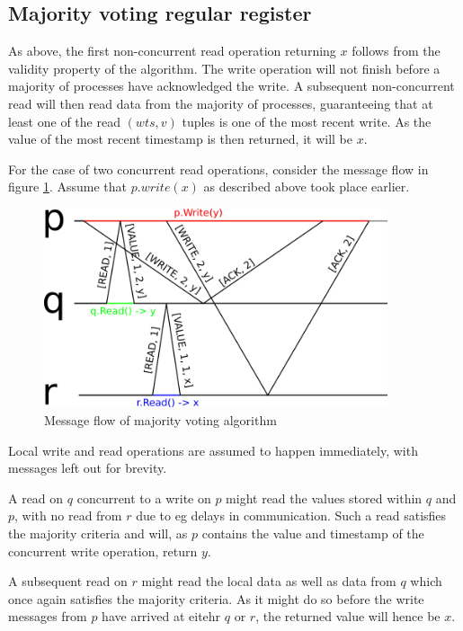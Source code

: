 \documentclass[a4paper]{scrreprt}
\begin{document}
\subsection{Majority voting regular register}

As above, the first non-concurrent read operation returning $x$ follows from
the validity property of the algorithm. The write operation will not finish
before a majority of processes have acknowledged the write. A subsequent
non-concurrent read will then read data from the majority of processes,
guaranteeing that at least one of the read $(wts, v)$ tuples is one of the most
recent write. As the value of the most recent timestamp is then returned, it
will be $x$.

For the case of two concurrent read operations, consider the message flow in
figure \ref{fig:majority_voting}. Assume that $p.write(x)$ as described above
took place earlier.

\begin{figure}[h]
    \centering
    \includegraphics[width=0.9\textwidth]{res/5_1_b.png}
    \caption{Message flow of majority voting algorithm}
    \label{fig:majority_voting}
\end{figure}

Local write and read operations are assumed to happen immediately, with
messages left out for brevity.

A read on $q$ concurrent to a write on $p$ might read the values stored within
$q$ and $p$, with no read from $r$ due to eg delays in communication. Such a
read satisfies the majority criteria and will, as $p$ contains the value and
timestamp of the concurrent write operation, return $y$.

A subsequent read on $r$ might read the local data as well as data from $q$
which once again satisfies the majority criteria. As it might do so before the
write messages from $p$ have arrived at eitehr $q$ or $r$, the returned value
will hence be $x$.
\end{document}
